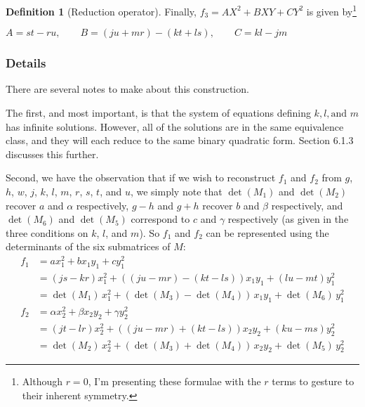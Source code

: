 \documentclass{article}
\theoremstyle{definition}
\newtheorem{definition}{Definition}[section]
\theoremstyle{theorem}
\theoremstyle{example}
\theoremstyle{corollary}
\begin{document}
\begin{definition}[Reduction operator]
\bigskip

Finally, \(f_{3} = A X^{2} + B X Y + C Y^{2}\) is given by\footnote{Although \(r = 0\), I'm presenting these formulae with the \(r\) terms to gesture to their inherent symmetry.}
\begin{center}
\(A = s t - r u, \quad \quad B = (j u + m r) - (k t + l s), \quad \quad C = k l - j m\)
\end{center}

\bigskip

\subsubsection{Details}

There are several notes to make about this construction.

\bigskip

The first, and most important, is that the system of equations defining \(k, l, \textrm{and } m\) has infinite solutions. However, all of the solutions are in the same equivalence class, and they will each reduce to the same binary quadratic form. Section 6.1.3 discusses this further.
\bigskip

Second, we have the observation that if we wish to reconstruct \(f_{1}\) and \(f_{2}\) from \(g\), \(h\), \(w\), \(j\), \(k\), \(l\), \(m\), \(r\), \(s\), \(t\), and \(u\), we simply note that \(\det(M_{1})\) and \(\det(M_{2})\) recover \(a\) and \(\alpha\) respectively, \(g - h\) and \(g + h\) recover \(b\) and \(\beta\) respectively, and \(\det(M_{6})\) and \(\det(M_{5})\) correspond to \(c\) and \(\gamma\) respectively (as given in the three conditions on \(k\), \(l\), and \(m\)). So \(f_{1}\) and \(f_{2}\) can be represented using the determinants of the six submatrices of \(M\):
\begin{align*}
f_{1} &= a x_{1}^{2} + b x_{1} y_{1} + c y_{1}^{2} \\
&= (j s - k r) x_{1}^{2} + ( (j u - m r) - (k t - l s) ) x_{1} y_{1} + (l u - m t) y_{1}^{2} \\
&= \det(M_{1})\, x_{1}^{2} + ( \det(M_{3}) - \det(M_{4}) )\, x_{1} y_{1} + \det(M_{6})\, y_{1}^{2} \\
f_{2} &= \alpha x_{2}^{2} + \beta x_{2} y_{2} + \gamma y_{2}^{2} \\
&= (j t - l r) x_{2}^{2} + ( (j u - m r) + (k t - l s) ) x_{2} y_{2} + (k u - m s) y_{2}^{2} \\
&= \det(M_{2})\, x_{2}^{2} + ( \det(M_{3}) + \det(M_{4}) )\, x_{2} y_{2} + \det(M_{5})\, y_{2}^{2}
\end{align*}


\end{definition}
\end{document}
